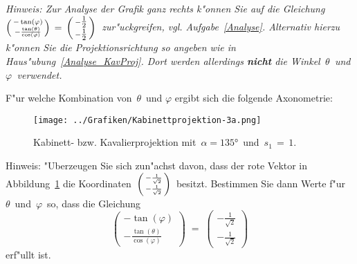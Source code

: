 \begin{Aufgabe}
\textit{Hinweis: Zur Analyse der Grafik ganz rechts k"onnen Sie auf die Gleichung\,  $\begin{psmallmatrix} - \tan(\varphi) \\ - \frac{\tan(\theta)}{\cos(\varphi)} \end{psmallmatrix}\, =\, \begin{psmallmatrix} -\tfrac{1}{2}\\ -\tfrac{1}{2}\end{psmallmatrix}$\, zur"uckgreifen, vgl. Aufgabe~\ref{Analyse}. Alternativ hierzu k"onnen Sie die Projektionsrichtung so angeben wie in Haus"ubung~\ref{Analyse_KavProj}. Dort werden allerdings \textbf{nicht} die Winkel\, $\theta$\, und\, $\varphi$\, verwendet.}
\begin{Teilaufgaben}
\item F"ur welche Kombination von\, $\theta$\, und  $\varphi$ ergibt sich die folgende Axonometrie:
 \begin{figure}[ht]
  \centering
  \texttt{[image: ../Grafiken/Kabinettprojektion-3a.png]}
  \caption{Kabinett- bzw. Kavalierprojektion mit\, $\alpha = \ang{135}$\, und \,$s_1\, =\,1$.}
  \label{KabinettprojTut}
  \end{figure}

  Hinweis: "Uberzeugen Sie sich zun"achst davon, dass der rote Vektor in Abbildung~\ref{KabinettprojTut} die Koordinaten\, $\begin{psmallmatrix} - \frac{1}{\sqrt{2}}\\ - \frac{1}{\sqrt{2}} \end{psmallmatrix}$\, besitzt. Bestimmen Sie dann Werte f"ur\, $\theta$\, und\, $\varphi$\, so, dass die Gleichung \[\begin{pmatrix} - \tan(\varphi) \\ - \frac{\tan(\theta)}{\cos(\varphi)} \end{pmatrix}\;=\;\begin{pmatrix} - \frac{1}{\sqrt{2}}\\ - \frac{1}{\sqrt{2}} \end{pmatrix}\] erf"ullt ist.
\end{Teilaufgaben}
\end{Aufgabe}
%
